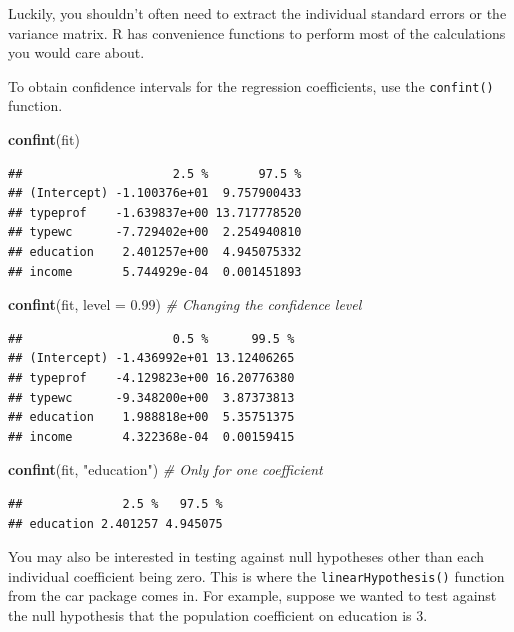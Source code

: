\documentclass[12pt,oneside,openany]{book}
\newenvironment{Shaded}{\begin{snugshade}}{\end{snugshade}}
\newcommand{\KeywordTok}[1]{\textcolor[rgb]{0.13,0.29,0.53}{\textbf{#1}}}
\newcommand{\DataTypeTok}[1]{\textcolor[rgb]{0.13,0.29,0.53}{#1}}
\newcommand{\FloatTok}[1]{\textcolor[rgb]{0.00,0.00,0.81}{#1}}
\newcommand{\StringTok}[1]{\textcolor[rgb]{0.31,0.60,0.02}{#1}}
\newcommand{\CommentTok}[1]{\textcolor[rgb]{0.56,0.35,0.01}{\textit{#1}}}
\newcommand{\NormalTok}[1]{#1}
\begin{document}
Luckily, you shouldn't often need to extract the individual standard
errors or the variance matrix. R has convenience functions to perform
most of the calculations you would care about.

To obtain confidence intervals for the regression coefficients, use the
\texttt{confint()} function.

\begin{Shaded}
\begin{Highlighting}[]
\KeywordTok{confint}\NormalTok{(fit)}
\end{Highlighting}
\end{Shaded}

\begin{verbatim}
##                     2.5 %       97.5 %
## (Intercept) -1.100376e+01  9.757900433
## typeprof    -1.639837e+00 13.717778520
## typewc      -7.729402e+00  2.254940810
## education    2.401257e+00  4.945075332
## income       5.744929e-04  0.001451893
\end{verbatim}

\begin{Shaded}
\begin{Highlighting}[]
\KeywordTok{confint}\NormalTok{(fit, }\DataTypeTok{level =} \FloatTok{0.99}\NormalTok{)  }\CommentTok{# Changing the confidence level}
\end{Highlighting}
\end{Shaded}

\begin{verbatim}
##                     0.5 %      99.5 %
## (Intercept) -1.436992e+01 13.12406265
## typeprof    -4.129823e+00 16.20776380
## typewc      -9.348200e+00  3.87373813
## education    1.988818e+00  5.35751375
## income       4.322368e-04  0.00159415
\end{verbatim}

\begin{Shaded}
\begin{Highlighting}[]
\KeywordTok{confint}\NormalTok{(fit, }\StringTok{"education"}\NormalTok{)   }\CommentTok{# Only for one coefficient}
\end{Highlighting}
\end{Shaded}

\begin{verbatim}
##              2.5 %   97.5 %
## education 2.401257 4.945075
\end{verbatim}

You may also be interested in testing against null hypotheses other than
each individual coefficient being zero. This is where the
\texttt{linearHypothesis()} function from the car package comes in. For
example, suppose we wanted to test against the null hypothesis that the
population coefficient on education is 3.
\end{document}
